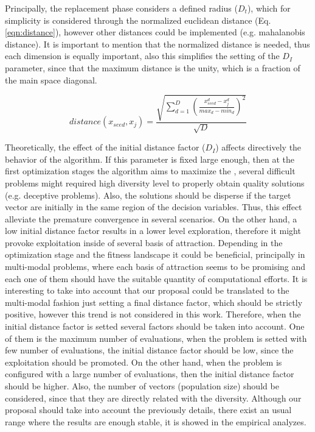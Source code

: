 Principally, the replacement phase considers a defined radius ($D_t$), which for simplicity is considered through the normalized euclidean distance (Eq. \ref{eqn:distance}), however other distances could be implemented (e.g. mahalanobis distance).
%
It is important to mention that the normalized distance is needed, thus each dimension is equally important, also this simplifies the setting of the $D_I$ parameter, since that the maximum distance is the unity, which is a fraction of the main space diagonal.

\begin{equation}\label{eqn:distance}
distance ( x_{seed}, x_j ) = \frac{\sqrt{ \sum_{d=1}^D \left ( \frac{x_{seed}^d - x_j^d}{max_d - min_d} \right )^2  }} {\sqrt{D}}
\end{equation}


%
Theoretically, the effect of the initial distance factor ($D_I$) affects directively the behavior of the algorithm.
%
If this parameter is fixed large enough, then at the first optimization stages the algorithm aims to maximize the \DCN{}, several difficult problems might required high diversity level to properly obtain quality solutions (e.g. deceptive problems).
%
Also, the solutions should be disperse if the target vector are initially in the same region of the decision variables.
%
Thus, this effect alleviate the premature convergence in several scenarios.
%
On the other hand, a low initial distance factor results in a lower level exploration, therefore it might provoke exploitation inside of several basis of attraction.
%
Depending in the optimization stage and the fitness landscape it could be beneficial, principally in multi-modal problems, where each basis of attraction seems to be promising and each one of them should have the suitable quantity of computational efforts.
%
It is interesting to take into account that our proposal could be translated to the multi-modal fashion just setting a final distance factor, which should be strictly positive, however this trend is not considered in this work.
%
Therefore, when the initial distance factor is setted several factors should be taken into account.
%
One of them is the maximum number of evaluations, when the problem is setted with few number of evaluations, the initial distance factor should be low, since the exploitation should be promoted.
%
On the other hand, when the problem is configured with a large number of evaluations, then the initial distance factor should be higher.
%
Also, the number of vectors (population size) should be considered, since that they are directly related with the diversity.
%
Although our proposal should take into account the previously details, there exist an usual range where the results are enough stable, it is showed in the empirical analyzes.
%

